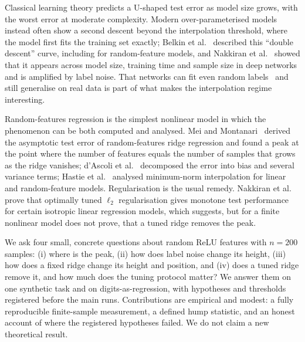Classical learning theory predicts a U-shaped test error as model size grows, with the worst error at moderate complexity. Modern over-parameterised models instead often show a second descent beyond the interpolation threshold, where the model first fits the training set exactly; Belkin et al.~\cite{belkin2018reconciling} described this ``double descent'' curve, including for random-feature models, and Nakkiran et al.~\cite{nakkiran2019deep} showed that it appears across model size, training time and sample size in deep networks and is amplified by label noise. That networks can fit even random labels~\cite{zhang2016understanding} and still generalise on real data is part of what makes the interpolation regime interesting.

Random-features regression is the simplest nonlinear model in which the phenomenon can be both computed and analysed. Mei and Montanari~\cite{mei2019generalization} derived the asymptotic test error of random-features ridge regression and found a peak at the point where the number of features equals the number of samples that grows as the ridge vanishes; d'Ascoli et al.~\cite{dascoli2020double} decomposed the error into bias and several variance terms; Hastie et al.~\cite{hastie2019surprises} analysed minimum-norm interpolation for linear and random-feature models. Regularisation is the usual remedy. Nakkiran et al.~\cite{nakkiran2020optimal} prove that optimally tuned $\ell_2$ regularisation gives monotone test performance for certain isotropic linear regression models, which suggests, but for a finite nonlinear model does not prove, that a tuned ridge removes the peak.

We ask four small, concrete questions about random ReLU features with $n=200$ samples: (i) where is the peak, (ii) how does label noise change its height, (iii) how does a fixed ridge change its height and position, and (iv) does a tuned ridge remove it, and how much does the tuning protocol matter? We answer them on one synthetic task and on digits-as-regression, with hypotheses and thresholds registered before the main runs. Contributions are empirical and modest: a fully reproducible finite-sample measurement, a defined hump statistic, and an honest account of where the registered hypotheses failed. We do not claim a new theoretical result.
